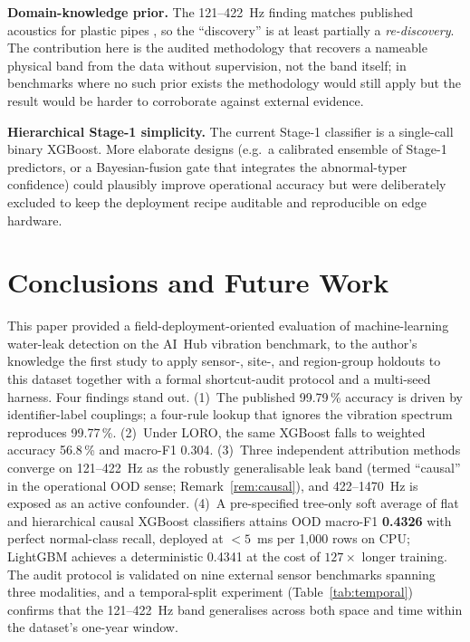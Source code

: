 \documentclass[3p,times,authoryear]{elsarticle}
\theoremstyle{remark}
\begin{document}
\textbf{Domain-knowledge prior.} The 121--422~Hz finding
matches published acoustics for plastic pipes
\cite{hunaidi2000plastic,almeida2014leak,gao2017model}, so the
``discovery'' is at least partially a \emph{re-discovery}. The
contribution here is the audited methodology that recovers a
nameable physical band from the data without supervision, not
the band itself; in benchmarks where no such prior exists the
methodology would still apply but the result would be harder
to corroborate against external evidence.

\textbf{Hierarchical Stage-1 simplicity.} The current Stage-1
classifier is a single-call binary XGBoost. More elaborate
designs (e.g.\ a calibrated ensemble of Stage-1 predictors, or
a Bayesian-fusion gate that integrates the abnormal-typer
confidence) could plausibly improve operational accuracy but
were deliberately excluded to keep the deployment recipe
auditable and reproducible on edge hardware.

\section{Conclusions and Future Work}\label{sec:conclusions}

This paper provided a field-deployment-oriented evaluation of
machine-learning water-leak detection on the AI~Hub vibration
benchmark, to the author's knowledge the first study to apply
sensor-, site-, and region-group holdouts to this dataset
together with a formal shortcut-audit protocol and a
multi-seed harness. Four findings stand out. (1)~The published
99.79\,\% accuracy is driven by identifier-label couplings;
a four-rule lookup that ignores the vibration spectrum
reproduces 99.77\,\%. (2)~Under LORO, the same XGBoost falls
to weighted accuracy 56.8\,\% and macro-F1 0.304.
(3)~Three independent attribution methods converge on
121--422~Hz as the robustly generalisable leak band (termed
``causal'' in the operational OOD sense;
Remark~\ref{rem:causal}), and 422--1470~Hz is exposed as an
active confounder. (4)~A pre-specified tree-only soft average of
flat and hierarchical causal XGBoost classifiers attains OOD
macro-F1 \textbf{0.4326} with perfect normal-class recall,
deployed at $<5$~ms per 1{,}000 rows on CPU; LightGBM achieves
a deterministic 0.4341 at the cost of $127\times$ longer
training. The audit protocol is validated on nine external
sensor benchmarks spanning three modalities, and a temporal-split
experiment (Table~\ref{tab:temporal}) confirms that the
121--422~Hz band generalises across both space and time within
the dataset's one-year window.
\end{document}
